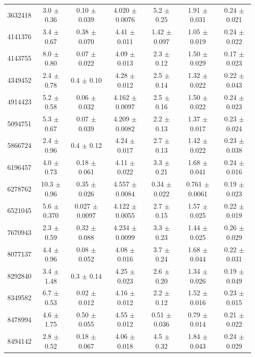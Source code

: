{\begin{table}
\begin{tabular}{ccccccc}
 3632418 &  3.0 $\pm$ 0.36  & 0.10  $\pm$ 0.039  & 4.020 $\pm$ 0.0076 & 5.2  $\pm$ 0.25  & 1.91  $\pm$ 0.031  & 0.24  $\pm$ 0.021 \\
 4141376 &  3.4 $\pm$ 0.67  & 0.38  $\pm$ 0.070  & 4.41  $\pm$ 0.011  & 1.42 $\pm$ 0.097 & 1.05  $\pm$ 0.019  & 0.24  $\pm$ 0.022 \\
 4143755 &  8.0 $\pm$ 0.80  & 0.07  $\pm$ 0.022  & 4.09  $\pm$ 0.013  & 2.3  $\pm$ 0.12  & 1.50  $\pm$ 0.029  & 0.17  $\pm$ 0.023 \\
 4349452 &  2.4 $\pm$ 0.78  & 0.4   $\pm$ 0.10   & 4.28  $\pm$ 0.012  & 2.5  $\pm$ 0.14  & 1.32  $\pm$ 0.022  & 0.22  $\pm$ 0.043 \\
 4914423 &  5.2 $\pm$ 0.58  & 0.06  $\pm$ 0.032  & 4.162 $\pm$ 0.0097 & 2.5  $\pm$ 0.16  & 1.50  $\pm$ 0.022  & 0.24  $\pm$ 0.023 \\
 5094751 &  5.3 $\pm$ 0.67  & 0.07  $\pm$ 0.039  & 4.209 $\pm$ 0.0082 & 2.2  $\pm$ 0.13  & 1.37  $\pm$ 0.017  & 0.23  $\pm$ 0.024 \\
 5866724 &  2.4 $\pm$ 0.96  & 0.4   $\pm$ 0.12   & 4.24  $\pm$ 0.017  & 2.7  $\pm$ 0.13  & 1.42  $\pm$ 0.022  & 0.23  $\pm$ 0.038 \\
 6196457 &  4.0 $\pm$ 0.73  & 0.18  $\pm$ 0.061  & 4.11  $\pm$ 0.022  & 3.3  $\pm$ 0.21  & 1.68  $\pm$ 0.041  & 0.24  $\pm$ 0.016 \\
 6278762 & 10.3 $\pm$ 0.96  & 0.35  $\pm$ 0.026  & 4.557 $\pm$ 0.0084 & 0.34 $\pm$ 0.022 & 0.761 $\pm$ 0.0061 & 0.19  $\pm$ 0.023 \\
 6521045 &  5.6 $\pm$ 0.370 & 0.027 $\pm$ 0.0097 & 4.122 $\pm$ 0.0055 & 2.7  $\pm$ 0.15  & 1.57  $\pm$ 0.025  & 0.22  $\pm$ 0.019 \\
 7670943 &  2.3 $\pm$ 0.59  & 0.32  $\pm$ 0.088  & 4.234 $\pm$ 0.0099 & 3.3  $\pm$ 0.23  & 1.44  $\pm$ 0.025  & 0.26  $\pm$ 0.029 \\
 8077137 &  4.4 $\pm$ 0.96  & 0.08  $\pm$ 0.052  & 4.08  $\pm$ 0.016  & 3.7  $\pm$ 0.24  & 1.68  $\pm$ 0.044  & 0.22  $\pm$ 0.031 \\
 8292840 &  3.4 $\pm$ 1.48  & 0.3   $\pm$ 0.14   & 4.25  $\pm$ 0.023  & 2.6  $\pm$ 0.20  & 1.34  $\pm$ 0.026  & 0.19  $\pm$ 0.049 \\
 8349582 &  6.7 $\pm$ 0.53  & 0.02  $\pm$ 0.012  & 4.16  $\pm$ 0.012  & 2.2  $\pm$ 0.12  & 1.52  $\pm$ 0.016  & 0.23  $\pm$ 0.015 \\
 8478994 &  4.6 $\pm$ 1.75  & 0.50  $\pm$ 0.055  & 4.55  $\pm$ 0.012  & 0.51 $\pm$ 0.036 & 0.79  $\pm$ 0.014  & 0.21  $\pm$ 0.022 \\
 8494142 &  2.8 $\pm$ 0.52  & 0.18  $\pm$ 0.067  & 4.06  $\pm$ 0.018  & 4.5  $\pm$ 0.32  & 1.84  $\pm$ 0.043  & 0.24  $\pm$ 0.029 \\

\end{tabular}
\end{table}}

